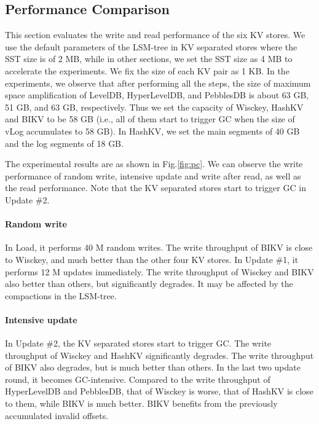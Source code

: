 \documentclass[sigconf]{acmart}
\begin{document}
\subsection{Performance Comparison}
This section evaluates the write and read performance of the six KV stores. We use the default parameters of the LSM-tree in KV separated stores where the SST size is of 2 MB, while in other sections, we set the SST size as 4 MB to accelerate the experiments. We fix the size of each KV pair as 1 KB. In the experiments, we observe that after performing all the steps, the size of maximum space amplification of LevelDB, HyperLevelDB, and PebblesDB is about 63 GB, 51 GB, and 63 GB, respectively. Thus we set the capacity of Wisckey, HashKV and BIKV to be 58 GB (i.e., all of them start to trigger GC when the size of vLog accumulates to 58 GB). In HashKV, we set the main segments of 40 GB and the log segments of 18 GB. 

The experimental results are as shown in Fig.\ref{fig:pc}. We can observe the write performance of random write, intensive update and write after read, as well as the read performance. Note that the KV separated stores start to trigger GC in Update \#2.

\paragraph*{Random write}
In Load, it performs 40 M random writes. The write throughput of BIKV is close to Wisckey, and much better than the other four KV stores. In Update \#1, it performs 12 M updates immediately. The write throughput of Wisckey and BIKV also better than others, but significantly degrades. It may be affected by the compactions in the LSM-tree. 

\paragraph*{Intensive update}
In Update \#2, the KV separated stores start to trigger GC. The write throughput of Wisckey and HashKV significantly degrades. The write throughput of BIKV also degrades, but is much better than others. In the last two update round, it becomes GC-intensive. Compared to the write throughput of HyperLevelDB and PebblesDB,  that of Wisckey is worse, that of HashKV is close to them, while BIKV is much better. BIKV benefits from the previously accumulated invalid offsets.  
\end{document}
